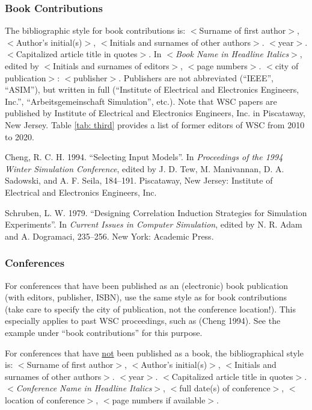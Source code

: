 \documentclass{wscpaperproc}
\theoremstyle{wsc}
\begin{document}
\subsubsection{Book Contributions}
The bibliographic style for book contributions is: 
$<$Surname of first author$>$, $<$Author’s initial(s)$>$, $<$Initials and surnames of other authors$>$. $<$year$>$. 
$<$Capitalized article title in quotes$>$. In $<${\em Book Name in Headline Italics}$>$, 
edited by $<$Initials and surnames of editors$>$, $<$page numbers$>$. $<$city of publication$>$: $<$publisher$>$.
Publishers are not abbreviated (``IEEE'', ``ASIM''), but written in full (``Institute of Electrical and Electronics Engineers, Inc.'', ``Arbeitsgemeinschaft Simulation'', etc.). Note that WSC papers are published by Institute of Electrical and Electronics Engineers, Inc. in Piscataway, New Jersey. Table \ref{tab: third} provides a list of former editors of WSC from 2010 to 2020. 

{\footnotesize
\begin{hangref}
\item Cheng, R. C. H. 1994. ``Selecting Input Models''. In \textit{Proceedings of the 1994 Winter Simulation Conference}, edited by J. D. Tew, M. Manivannan, D. A. Sadowski, and A. F. Seila, 184–191. Piscataway, New Jersey: Institute of Electrical and Electronics Engineers, Inc. 
\item Schruben, L. W. 1979. ``Designing Correlation Induction Strategies for Simulation Experiments''. In \textit{Current Issues in Computer Simulation}, edited by N. R. Adam and A. Dogramaci, 235–256. New York: Academic Press.
\end{hangref}
}

\subsubsection{Conferences}
For conferences that have been published as an (electronic) book publication (with editors, publisher, ISBN),
use the same style as for book contributions (take care to specify the city of publication, not the conference location!). 
This especially applies to past WSC proceedings, such as (Cheng 1994). See the example under ``book contributions'' for this purpose.

For conferences that have \underline{not} been published as a book, the bibliographical style is: 
$<$Surname of first author$>$, $<$Author’s initial(s)$>$, $<$Initials and surnames of other authors$>$. $<$year$>$. 
$<$Capitalized article title in quotes$>$. $<${\em Conference Name in Headline Italics}$>$, $<$full date(s) of conference$>$, 
$<$location of conference$>$, $<$page numbers if available$>$.
\end{document}
